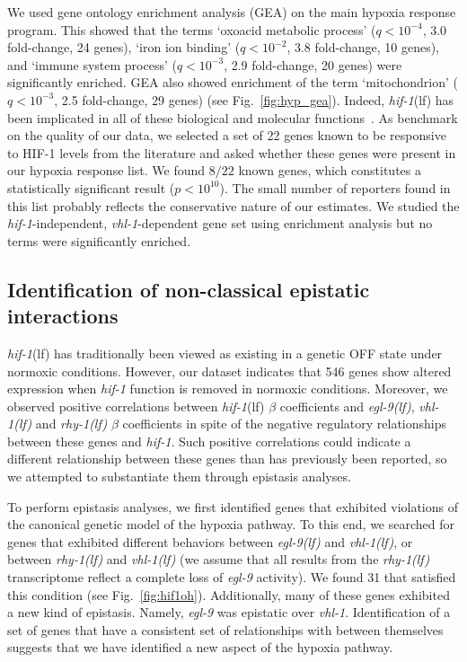 \documentclass[10pt, onecolumn]{article}
\newcommand{\qval}[1]{$q<10^{-#1}$}
\newcommand{\gene}[1]{\emph{#1}}
\newcommand{\egl}{\emph{\mbox{egl-9}(lf)}}
\newcommand{\rhy}{\emph{\mbox{rhy-1}(lf)}}
\newcommand{\vhl}{\emph{\mbox{vhl-1}(lf)}}
\newcommand{\hif}{\emph{\mbox{hif-1}}(lf)}
\newcommand{\hifp}{HIF-1}
\newcommand{\hifn}{546}
\newcommand{\hifohtargets}{31}
\begin{document}
We used gene ontology enrichment analysis (GEA) on the main hypoxia response program.
This showed that the terms `oxoacid metabolic process' (\qval{4}, 3.0 fold-change,
24 genes), `iron ion binding' (\qval{2}, 3.8 fold-change, 10 genes), and `immune
system process' (\qval{3}, 2.9 fold-change, 20 genes) were significantly enriched.
GEA also showed enrichment of the term `mitochondrion' (\qval{3}, 2.5 fold-change,
29 genes) (see Fig.~\ref{fig:hyp_gea}). Indeed, \hif{} has been implicated in
all of these biological and molecular functions~\cite{Luhachack2012,Ackerman2012,
Romney2011,Semenza2011}.
As benchmark on the quality of our data, we selected a set of 22 genes known to
be responsive to \hifp{} levels from the literature and asked whether these genes
were present in our hypoxia response list. We found $8/22$ known genes, which
constitutes a statistically significant result ($p<10^{10}$). The small number of
reporters found in this list probably reflects the conservative nature of our
estimates.
We studied the \gene{hif-1}-independent, \gene{vhl-1}-dependent gene set
using enrichment analysis but no terms were significantly enriched.

\subsection*{Identification of non-classical epistatic interactions}
\label{sub:hifoh}
\hif{} has traditionally been viewed as existing in a genetic OFF state under
normoxic conditions. However, our dataset indicates that \hifn{} genes show
altered expression when \gene{hif-1} function is removed in normoxic conditions.
Moreover, we observed positive correlations between \hif{} $\beta$ coefficients
and \egl{}, \vhl{} and \rhy{} $\beta$ coefficients in spite of the negative
regulatory relationships between these genes and \gene{hif-1}. Such
positive correlations could indicate a different relationship between these genes
than has previously been reported, so we attempted to substantiate them through
epistasis analyses.

To perform epistasis analyses, we first identified genes that exhibited violations
of the canonical genetic model of the hypoxia pathway. To this end, we searched for
genes that exhibited different behaviors between \egl{} and \vhl{}, or
between \rhy{} and \vhl{} (we assume that all results from the
\rhy{} transcriptome reflect a complete loss of \gene{egl-9} activity). We found
\hifohtargets{} that satisfied this condition (see Fig.~\ref{fig:hif1oh}).
Additionally, many of these genes exhibited a new kind of epistasis. Namely,
\gene{egl-9} was epistatic over \gene{vhl-1}. Identification of a set of genes
that have a consistent set of relationships with between themselves suggests that
we have identified a new aspect of the hypoxia pathway.
\end{document}
